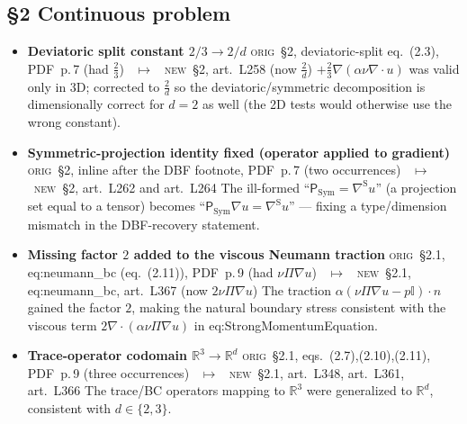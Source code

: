 \documentclass[11pt]{article}
\newcommand{\SPi}{\mathsf{P}_{\mathrm{Sym}}}
\newcommand{\Orig}{\textcolor{origc}{\footnotesize\textsc{orig}}}
\newcommand{\New}{\textcolor{newc}{\footnotesize\textsc{new}}}
\newcommand{\code}[1]{\textcolor{newc}{\ttfamily\small #1}}
\newcommand{\pdfp}[1]{PDF~p.\,#1}
\newcommand{\artl}[1]{art.\ L#1}       %
\newcommand{\ch}[4]{%
  \item \textbf{#1}\newline
    {\footnotesize\Orig\ #2 \ \textcolor{locc}{$\longmapsto$} \ \New\ #3}\newline
    #4}
\begin{document}
\subsection{\S2 Continuous problem}
\begin{itemize}
\ch{Deviatoric split constant $2/3 \to 2/d$}
   {\S2, deviatoric-split eq.~(2.3), \pdfp{7} (had $\tfrac23$)}
   {\S2, \artl{258} (now $\tfrac2d$)}
   {$+\tfrac23\nabla(\alpha\nu\nabla\!\cdot\!u)$ was valid only in 3D; corrected to $\tfrac2d$ so the
    deviatoric/symmetric decomposition is dimensionally correct for $d{=}2$ as well (the 2D tests would
    otherwise use the wrong constant).}
\ch{Symmetric-projection identity fixed (operator applied to gradient)}
   {\S2, inline after the DBF footnote, \pdfp{7} (two occurrences)}
   {\S2, \artl{262} and \artl{264}}
   {The ill-formed ``$\SPi=\nabla^{\mathrm S}u$'' (a projection set equal to a tensor) becomes
    ``$\SPi\nabla u=\nabla^{\mathrm S}u$'' --- fixing a type/dimension mismatch in the DBF-recovery
    statement.}
\ch{Missing factor $2$ added to the viscous Neumann traction}
   {\S2.1, eq:neumann\_bc (eq.~(2.11)), \pdfp{9} (had $\nu\Pi\nabla u$)}
   {\S2.1, \code{eq:neumann\_bc}, \artl{367} (now \textcolor{amend}{$2$}$\nu\Pi\nabla u$)}
   {The traction $\alpha(\nu\Pi\nabla u-p\mathbb I)\!\cdot\!n$ gained the factor $2$, making the
    natural boundary stress consistent with the viscous term $2\nabla\!\cdot\!(\alpha\nu\Pi\nabla u)$
    in \code{eq:StrongMomentumEquation}.}
\ch{Trace-operator codomain $\mathbb R^3 \to \mathbb R^d$}
   {\S2.1, eqs.~(2.7),(2.10),(2.11), \pdfp{9} (three occurrences)}
   {\S2.1, \artl{348}, \artl{361}, \artl{366}}
   {The trace/BC operators mapping to $\mathbb R^3$ were generalized to $\mathbb R^d$, consistent with
    $d\in\{2,3\}$.}
\end{itemize}
\end{document}
